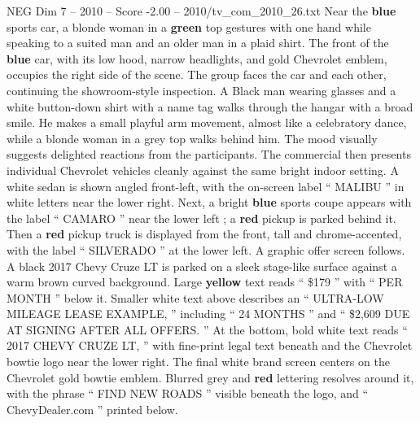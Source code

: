 \begin{textsample}{NEG Dim 7 – 2010 – Score -2.00 – 2010/tv\_com\_2010\_26.txt}
Near the \textbf{blue} sports car, a blonde woman in a \textbf{green} top gestures with one hand while speaking to a suited man and an older man in a plaid shirt.
The front of the \textbf{blue} car, with its low hood, narrow headlights, and gold Chevrolet emblem, occupies the right side of the scene.
The group faces the car and each other, continuing the showroom-style inspection.
A Black man wearing glasses and a white button-down shirt with a name tag walks through the hangar with a broad smile.
He makes a small playful arm movement, almost like a celebratory dance, while a blonde woman in a grey top walks behind him.
The mood visually suggests delighted reactions from the participants.
The commercial then presents individual Chevrolet vehicles cleanly against the same bright indoor setting.
A white sedan is shown angled front-left, with the on-screen label “ MALIBU ” in white letters near the lower right.
Next, a bright \textbf{blue} sports coupe appears with the label “ CAMARO ” near the lower left ; a \textbf{red} pickup is parked behind it.
Then a \textbf{red} pickup truck is displayed from the front, tall and chrome-accented, with the label “ SILVERADO ” at the lower left.
A graphic offer screen follows.
A black 2017 Chevy Cruze LT is parked on a sleek stage-like surface against a warm brown curved background.
Large \textbf{yellow} text reads “ \$179 ” with “ PER MONTH ” below it.
Smaller white text above describes an “ ULTRA-LOW MILEAGE LEASE EXAMPLE, ” including “ 24 MONTHS ” and “ \$2,609 DUE AT SIGNING AFTER ALL OFFERS. ” At the bottom, bold white text reads “ 2017 CHEVY CRUZE LT, ” with fine-print legal text beneath and the Chevrolet bowtie logo near the lower right.
The final white brand screen centers on the Chevrolet gold bowtie emblem.
Blurred grey and \textbf{red} lettering resolves around it, with the phrase “ FIND NEW ROADS ” visible beneath the logo, and “ ChevyDealer.com ” printed below.

\end{textsample}
